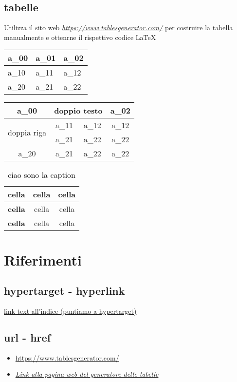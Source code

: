 \documentclass[12pt, a4paper]{article}
\begin{document}
	\subsection{tabelle}
	Utilizza il sito web \textit{\url{https://www.tablesgenerator.com/}} per costruire la tabella manualmente e ottenrne il rispettivo codice \LaTeX
	\begin{table}[h]
		\begin{tabular}{|l|l|l|}
			\hline
			a\_00 & a\_01 & a\_02 \\ \hline
			a\_10 & a\_11 & a\_12 \\ \hline
			a\_20 & a\_21 & a\_22 \\ \hline
		\end{tabular}
	\end{table}
	\begin{table}[h]
		\begin{tabular}{|c|cc|c|}
			\hline
			a\_00                        & \multicolumn{2}{c|}{doppio testo}  & a\_02 \\ \hline
			\multirow{2}{*}{doppia riga} & \multicolumn{1}{c|}{a\_11} & a\_12 & a\_12 \\ \cline{2-4} 
			& \multicolumn{1}{c|}{a\_21} & a\_22 & a\_22 \\ \hline
			a\_20                        & \multicolumn{1}{c|}{a\_21} & a\_22 & a\_22 \\ \hline
		\end{tabular}
	\end{table}
	\begin{table}[!ht]
		\centering
		\begin{tabular}{|c|c|c|}
			\hline
			\textbf{cella} & cella & cella \\ \hline
			\textbf{cella} & cella & cella \\ \hline
			\textbf{cella} & cella & cella \\ \hline
		\end{tabular}
		\caption{ciao sono la caption}
		\label{lbl_table3}
	\end{table}
	
	
	
	\newpage
	\section{Riferimenti}
	\subsection{hypertarget - hyperlink}
	\hyperlink{Sava target}{link text all'indice (puntiamo a hypertarget)}
	\subsection{url - href}
	\begin{itemize}[itemsep=1pt,topsep=0pt]
		\item \url{https://www.tablesgenerator.com/}
		\item \textit{\href{https://www.tablesgenerator.com/}{Link alla pagina web del generatore delle tabelle}}
	\end{itemize}
\end{document}
